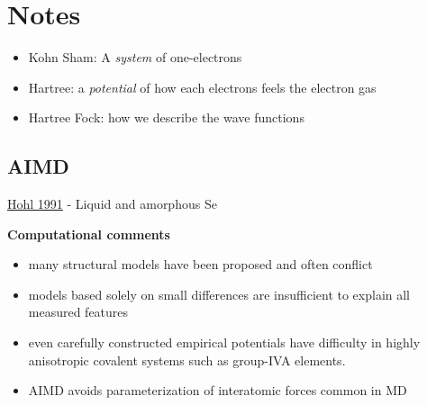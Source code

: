 \documentclass[3p,review,12pt]{elsarticle}
\newcommand{\vs}{\vspace{2mm}}
\begin{document}
\pagebreak

\section*{Notes}

\begin{itemize}
	\item Kohn Sham: A \emph{system} of one-electrons
	\item Hartree: a \emph{potential} of how each electrons feels the electron gas
	\item Hartree Fock: how we describe the wave functions
\end{itemize}
\subsection{AIMD}
\underline{Hohl 1991}\cite{Hohl1991} - Liquid and amorphous Se \par \vs
\textbf{Computational comments}
\begin{itemize}
	\item many structural models have been proposed and often conflict
	\item models based solely on small differences are insufficient to explain all measured features
	\item even carefully constructed empirical potentials have difficulty in highly anisotropic covalent systems such as group-IVA elements.
	\item AIMD avoids parameterization of interatomic forces common in MD
\end{itemize}
\end{document}
